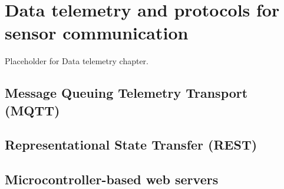 \setchapterpreamble[u]{\margintoc}
\chapter{\color{gray} Data telemetry and protocols for sensor communication \color{black}}

Placeholder for Data telemetry chapter.

\section{\color{gray} Message Queuing Telemetry Transport (MQTT) \color{black}}

\section{\color{gray} Representational State Transfer (REST) \color{black}}

\section{\color{gray} Microcontroller-based web servers \color{black}}
